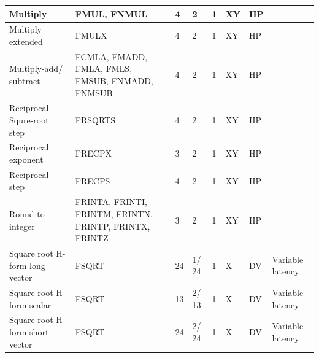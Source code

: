 \begin{longtable}{|p{1in}|p{1in}|l|l|l|p{1in}|l|p{1in}|}
\hline
Multiply & FMUL, FNMUL & 4 & 2 & 1 & XY & HP & \\
\hline
Multiply extended & FMULX & 4 & 2 & 1 & XY & HP & \\
\hline
Multiply-add/ subtract & FCMLA, FMADD, FMLA, FMLS, FMSUB, FNMADD, FNMSUB & 4 & 2 & 1 & XY & HP & \\
\hline
Reciprocal Squre-root step & FRSQRTS & 4 & 2 & 1 & XY & HP & \\
\hline
Reciprocal exponent & FRECPX & 3 & 2 & 1 & XY & HP & \\
\hline
Reciprocal step & FRECPS & 4 & 2 & 1 & XY & HP & \\
\hline
Round to integer & FRINTA, FRINTI, FRINTM, FRINTN, FRINTP, FRINTX, FRINTZ & 3 & 2 & 1 & XY & HP & \\
\hline
Square root H-form long vector & FSQRT & 24 & 1/ 24 & 1 & X & DV & Variable latency\\
\hline
Square root H-form scalar & FSQRT & 13 & 2/ 13 & 1 & X & DV & Variable latency\\
\hline
Square root H-form short vector & FSQRT & 24 & 2/ 24 & 1 & X & DV & Variable latency\\
\hline
\end{longtable}
\newpage

